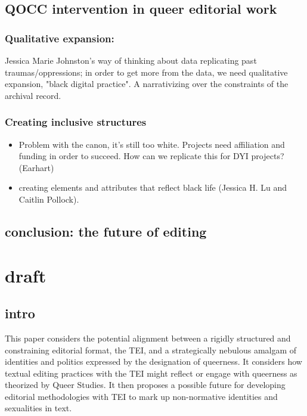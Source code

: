 \documentclass[11pt]{article}
\begin{document}
\subsection{QOCC intervention in queer editorial work}
\label{sec:org5e29c59}
\subsubsection{Qualitative expansion:}
\label{sec:orgee8d03a}
Jessica Marie Johnston's way of thinking about data replicating past
traumas/oppressions; in order to get more from the data, we need
qualitative expansion, "black digital practice". A narrativizing over
the constraints of the archival record.

\subsubsection{Creating inclusive structures}
\label{sec:org881ef37}
\begin{itemize}
\item Problem with the canon, it's still too white. Projects need
affiliation and funding in order to succeed. How can we replicate
this for DYI projects? (Earhart)
\item creating elements and attributes that reflect black life (Jessica
H. Lu and Caitlin Pollock).
\end{itemize}

\subsection{conclusion: the future of editing}
\label{sec:org46e5880}

\section{draft}
\label{sec:org435a041}
\subsection{intro}
\label{sec:orgc5484a2}
This paper considers the potential alignment between a rigidly
structured and constraining editorial format, the TEI, and a
strategically nebulous amalgam of identities and politics expressed by
the designation of queerness. It considers how textual editing
practices with the TEI might reflect or engage with queerness as
theorized by Queer Studies. It then proposes a possible future for
developing editorial methodologies with TEI to mark up non-normative
identities and sexualities in text.
\end{document}

